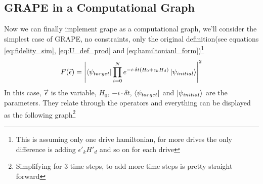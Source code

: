 \documentclass[english, a4paper, 12pt, twoside]{article}
\numberwithin{equation}{section} %
\begin{document}
\subsection{GRAPE in a Computational Graph}
Now we can finally implement grape as a computational graph, we'll consider the simplest case of GRAPE, no constraints, only the original definition(see equations \ref{eq:fidelity_sim}, \ref{eq:U_def_prod} and \ref{eq:hamiltonianl_form})\footnote{This is assuming only one drive hamiltonian, for more drives the only difference is adding $\epsilon'_k H'_d$ and so on for each drive} %
\[
    F(\vec{\epsilon}) = \abs{\bra{\psi_{target}} \prod_{i=0}^N e^{-i \cdot \delta t (H_0 + \epsilon_k H_d)} \ket{\psi_{initial}}}^2
\]
In this case, $\vec{\epsilon}$ is the variable, $H_0$, $-i \cdot \delta t$, $\bra{\psi_{target}}$ and $\ket{\psi_{initial}}$ are the parameters. They relate through the operators and everything can be displayed as the following graph\footnote{Simplifying for 3 time steps, to add more time steps is pretty straight forward}
\end{document}
